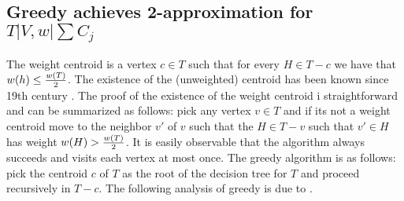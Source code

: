 \subsection{Greedy achieves 2-approximation for $T|V,w|\sum C_j$}
The weight centroid is a vertex $c\in T$ such that for every $H\in T-c$ we have that $w\mathopen{}\left( h \right)\leq \frac{w\mathopen{}\left( T \right)}{2}$. The existence of the (unweighted) centroid has been known since 19th century \cite{Jordan1869}. The proof of the existence of the weight centroid i straightforward and can be summarized as follows: pick any vertex $v\in T$ and if its not a weight centroid move to the neighbor $v'$ of $v$ such that the $H\in T-v$ such that $v'\in H$ has weight $w\mathopen{}\left( H \right)>\frac{w\mathopen{}\left( T \right)}{2}$. It is easily observable that the algorithm always succeeds and visits each vertex at most once. The greedy algorithm is as follows: pick the centroid $c$ of $T$ as the root of the decision tree for $T$ and proceed recursively in $T-c$. The following analysis of greedy is due to \cite{Fast_app_centroid_trees}.

